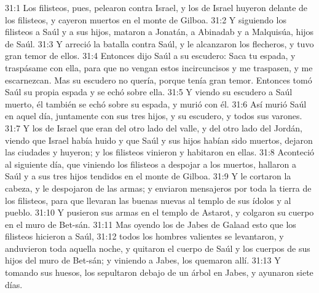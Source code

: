 31:1 Los filisteos, pues, pelearon contra Israel, y los de Israel huyeron delante de los filisteos, y cayeron muertos en el monte de Gilboa.  
31:2 Y siguiendo los filisteos a Saúl y a sus hijos, mataron a Jonatán, a Abinadab y a Malquisúa, hijos de Saúl.  
31:3 Y arreció la batalla contra Saúl, y le alcanzaron los flecheros, y tuvo gran temor de ellos.  
31:4 Entonces dijo Saúl a su escudero: Saca tu espada, y traspásame con ella, para que no vengan estos incircuncisos y me traspasen, y me escarnezcan. Mas su escudero no quería, porque tenía gran temor. Entonces tomó Saúl su propia espada y se echó sobre ella.  
31:5 Y viendo su escudero a Saúl muerto, él también se echó sobre su espada, y murió con él.  
31:6 Así murió Saúl en aquel día, juntamente con sus tres hijos, y su escudero, y todos sus varones.  
31:7 Y los de Israel que eran del otro lado del valle, y del otro lado del Jordán, viendo que Israel había huido y que Saúl y sus hijos habían sido muertos, dejaron las ciudades y huyeron; y los filisteos vinieron y habitaron en ellas.  
31:8 Aconteció al siguiente día, que viniendo los filisteos a despojar a los muertos, hallaron a Saúl y a sus tres hijos tendidos en el monte de Gilboa.  
31:9 Y le cortaron la cabeza, y le despojaron de las armas; y enviaron mensajeros por toda la tierra de los filisteos, para que llevaran las buenas nuevas al templo de sus ídolos y al pueblo.  
31:10 Y pusieron sus armas en el templo de Astarot, y colgaron su cuerpo en el muro de Bet-sán.  
31:11 Mas oyendo los de Jabes de Galaad esto que los filisteos hicieron a Saúl,  
31:12 todos los hombres valientes se levantaron, y anduvieron toda aquella noche, y quitaron el cuerpo de Saúl y los cuerpos de sus hijos del muro de Bet-sán; y viniendo a Jabes, los quemaron allí.  
31:13 Y tomando sus huesos, los sepultaron debajo de un árbol en Jabes, y ayunaron siete días.
